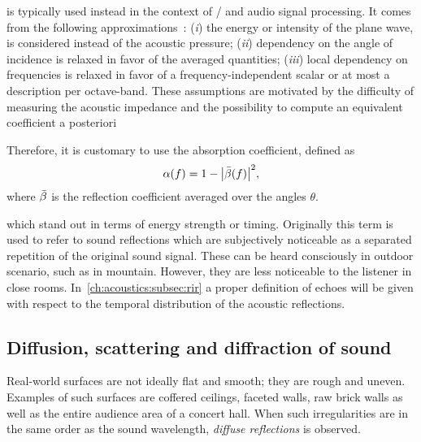  is typically used instead in the context of \GA/ and audio signal processing.
It comes from the following approximations~:
(\textit{i}) the energy or intensity of the plane wave, is considered instead of the acoustic pressure;
(\textit{ii}) dependency on the angle of incidence is relaxed in favor of the averaged quantities;
(\textit{iii}) local dependency on frequencies is relaxed in favor of a frequency-independent scalar or at most a description per octave-band.
These assumptions are motivated by the difficulty of measuring the acoustic impedance
and the possibility to compute an equivalent coefficient a posteriori

Therefore, it is customary to use the absorption coefficient, defined as
\begin{equation}
    \absCoeff(f) = 1 - \abs{\bar{\reflCoeff}(f)}^2
    ,
\end{equation}
where $\bar{\beta}$ is the reflection coefficient averaged over the angles $\theta$.

 which stand out in terms of energy strength or timing.
Originally this term is used to refer to sound reflections which are subjectively noticeable as a separated repetition of the original sound signal.
These can be heard consciously in outdoor scenario, such as in mountain. However, they are less noticeable to the listener in close rooms.
In~\cref{ch:acoustics:subsec:rir} a proper definition of echoes will be given with respect to the temporal distribution of the acoustic reflections.

\subsection{Diffusion, scattering and diffraction of sound}
Real-world surfaces are not ideally flat and smooth; they are rough and uneven.
Examples of such surfaces are coffered ceilings, faceted walls, raw brick walls as well as the entire audience area of a concert hall.
When such irregularities are in the same order as the sound wavelength, \textit{diffuse reflections} is observed.

